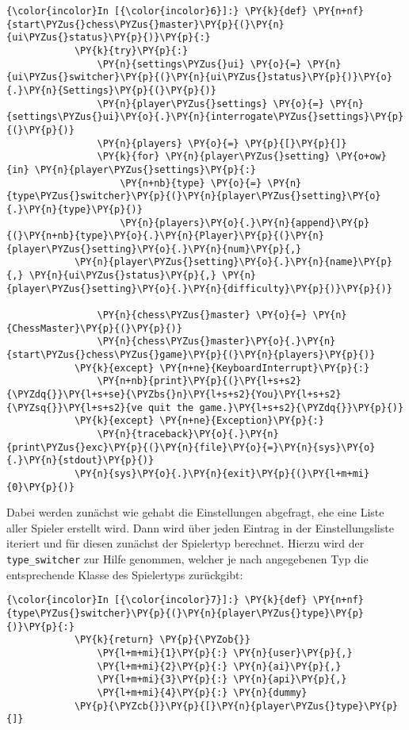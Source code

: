     \begin{Verbatim}[commandchars=\\\{\}]
{\color{incolor}In [{\color{incolor}6}]:} \PY{k}{def} \PY{n+nf}{start\PYZus{}chess\PYZus{}master}\PY{p}{(}\PY{n}{ui\PYZus{}status}\PY{p}{)}\PY{p}{:}    
            \PY{k}{try}\PY{p}{:}
                \PY{n}{settings\PYZus{}ui} \PY{o}{=} \PY{n}{ui\PYZus{}switcher}\PY{p}{(}\PY{n}{ui\PYZus{}status}\PY{p}{)}\PY{o}{.}\PY{n}{Settings}\PY{p}{(}\PY{p}{)}
                \PY{n}{player\PYZus{}settings} \PY{o}{=} \PY{n}{settings\PYZus{}ui}\PY{o}{.}\PY{n}{interrogate\PYZus{}settings}\PY{p}{(}\PY{p}{)}
                \PY{n}{players} \PY{o}{=} \PY{p}{[}\PY{p}{]}
                \PY{k}{for} \PY{n}{player\PYZus{}setting} \PY{o+ow}{in} \PY{n}{player\PYZus{}settings}\PY{p}{:}
                    \PY{n+nb}{type} \PY{o}{=} \PY{n}{type\PYZus{}switcher}\PY{p}{(}\PY{n}{player\PYZus{}setting}\PY{o}{.}\PY{n}{type}\PY{p}{)}
                    \PY{n}{players}\PY{o}{.}\PY{n}{append}\PY{p}{(}\PY{n+nb}{type}\PY{o}{.}\PY{n}{Player}\PY{p}{(}\PY{n}{player\PYZus{}setting}\PY{o}{.}\PY{n}{num}\PY{p}{,} 
			\PY{n}{player\PYZus{}setting}\PY{o}{.}\PY{n}{name}\PY{p}{,} \PY{n}{ui\PYZus{}status}\PY{p}{,} \PY{n}{player\PYZus{}setting}\PY{o}{.}\PY{n}{difficulty}\PY{p}{)}\PY{p}{)}
        
                \PY{n}{chess\PYZus{}master} \PY{o}{=} \PY{n}{ChessMaster}\PY{p}{(}\PY{p}{)}
                \PY{n}{chess\PYZus{}master}\PY{o}{.}\PY{n}{start\PYZus{}chess\PYZus{}game}\PY{p}{(}\PY{n}{players}\PY{p}{)}
            \PY{k}{except} \PY{n+ne}{KeyboardInterrupt}\PY{p}{:}
                \PY{n+nb}{print}\PY{p}{(}\PY{l+s+s2}{\PYZdq{}}\PY{l+s+se}{\PYZbs{}n}\PY{l+s+s2}{You}\PY{l+s+s2}{\PYZsq{}}\PY{l+s+s2}{ve quit the game.}\PY{l+s+s2}{\PYZdq{}}\PY{p}{)}
            \PY{k}{except} \PY{n+ne}{Exception}\PY{p}{:}
                \PY{n}{traceback}\PY{o}{.}\PY{n}{print\PYZus{}exc}\PY{p}{(}\PY{n}{file}\PY{o}{=}\PY{n}{sys}\PY{o}{.}\PY{n}{stdout}\PY{p}{)}
            \PY{n}{sys}\PY{o}{.}\PY{n}{exit}\PY{p}{(}\PY{l+m+mi}{0}\PY{p}{)}
\end{Verbatim}

    Dabei werden zunächst wie gehabt die Einstellungen abgefragt, ehe eine
Liste aller Spieler erstellt wird. Dann wird über jeden Eintrag in der
Einstellungsliste iteriert und für diesen zunächst der Spielertyp
berechnet. Hierzu wird der \texttt{type\_switcher} zur Hilfe genommen,
welcher je nach angegebenen Typ die entsprechende Klasse des Spielertyps
zurückgibt:

    \begin{Verbatim}[commandchars=\\\{\}]
{\color{incolor}In [{\color{incolor}7}]:} \PY{k}{def} \PY{n+nf}{type\PYZus{}switcher}\PY{p}{(}\PY{n}{player\PYZus{}type}\PY{p}{)}\PY{p}{:}
            \PY{k}{return} \PY{p}{\PYZob{}}
                \PY{l+m+mi}{1}\PY{p}{:} \PY{n}{user}\PY{p}{,}
                \PY{l+m+mi}{2}\PY{p}{:} \PY{n}{ai}\PY{p}{,}
                \PY{l+m+mi}{3}\PY{p}{:} \PY{n}{api}\PY{p}{,}
                \PY{l+m+mi}{4}\PY{p}{:} \PY{n}{dummy}
            \PY{p}{\PYZcb{}}\PY{p}{[}\PY{n}{player\PYZus{}type}\PY{p}{]}
\end{Verbatim}


